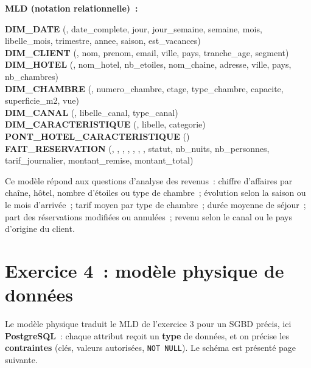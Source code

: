 \newpage
\noindent \textbf{MLD (notation relationnelle)~:}

\begin{tcolorbox}[colback=white, colframe=title1]
\small
\textbf{DIM\_DATE} (, date\_complete, jour, jour\_semaine, semaine, mois, libelle\_mois, trimestre, annee, saison, est\_vacances) \\
\textbf{DIM\_CLIENT} (, nom, prenom, email, ville, pays, tranche\_age, segment) \\
\textbf{DIM\_HOTEL} (, nom\_hotel, nb\_etoiles, nom\_chaine, adresse, ville, pays, nb\_chambres) \\
\textbf{DIM\_CHAMBRE} (, numero\_chambre, etage, type\_chambre, capacite, superficie\_m2, vue) \\
\textbf{DIM\_CANAL} (, libelle\_canal, type\_canal) \\
\textbf{DIM\_CARACTERISTIQUE} (, libelle, categorie) \\
\textbf{PONT\_HOTEL\_CARACTERISTIQUE} () \\
\textbf{FAIT\_RESERVATION} (, , , , , , , statut, nb\_nuits, nb\_personnes, tarif\_journalier, montant\_remise, montant\_total)
\end{tcolorbox}

\noindent Ce modèle répond aux questions d'analyse des revenus~: chiffre d'affaires par chaîne, hôtel, nombre d'étoiles ou type de chambre~; évolution selon la saison ou le mois d'arrivée~; tarif moyen par type de chambre~; durée moyenne de séjour~; part des réservations modifiées ou annulées~; revenu selon le canal ou le pays d'origine du client.

\newpage
\section*{Exercice 4~: modèle physique de données}

\noindent Le modèle physique traduit le MLD de l'exercice 3 pour un SGBD précis, ici \textbf{PostgreSQL}~: chaque attribut reçoit un \textbf{type} de données, et on précise les \textbf{contraintes} (clés, valeurs autorisées, \texttt{NOT NULL}). Le schéma est présenté page suivante.

